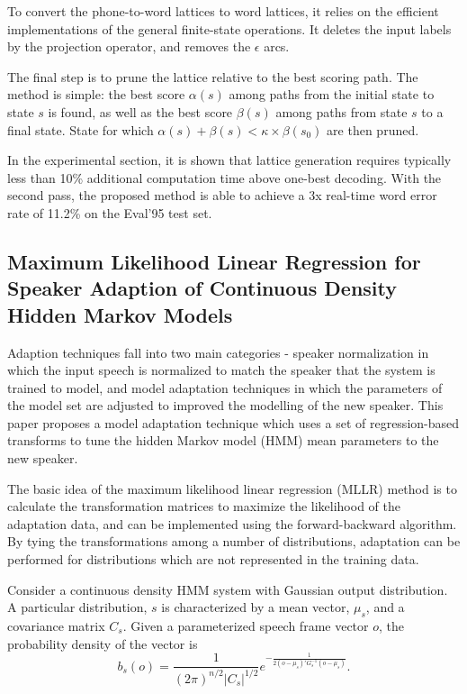 \documentclass[paper=a4, fontsize=18pt]{article} %
\numberwithin{equation}{section} %
\numberwithin{figure}{section} %
\numberwithin{table}{section} %
\begin{document}
To convert the phone-to-word lattices to word lattices, it relies on the efficient implementations of the general finite-state operations. It deletes the input labels by the projection operator, and removes the $\epsilon$ arcs.

The final step is to prune the lattice relative to the best scoring path. The method is simple: the best score $\alpha(s)$ among paths from the initial state to state $s$ is found, as well as the best score $\beta(s)$ among paths from state $s$ to a final state. State for which $\alpha(s) + \beta(s) < \kappa \times \beta(s_0)$ are then pruned.

In the experimental section, it is shown that lattice generation requires typically less than 10\% additional computation time above one-best decoding. With the second pass, the proposed method is able to achieve a 3x real-time word error rate of 11.2\% on the Eval'95 test set.


\subsection{Maximum Likelihood Linear Regression for Speaker Adaption of Continuous Density Hidden Markov Models \cite{Leggetter1995}}

Adaption techniques fall into two main categories - speaker normalization in which the input speech is normalized to match the speaker that the system is trained to model, and model adaptation techniques in which the parameters of the model set are adjusted to improved the modelling of the new speaker. This paper proposes a model adaptation technique which uses a set of regression-based transforms to tune the hidden Markov model (HMM) mean parameters to the new speaker.

The basic idea of the maximum likelihood linear regression (MLLR) method is to calculate the transformation matrices to maximize the likelihood of the adaptation data, and can be implemented using the forward-backward algorithm. By tying the transformations among a number of distributions, adaptation can be performed for distributions which are not represented in the training data.

Consider a continuous density HMM system with Gaussian output distribution. A particular distribution, $s$ is characterized by a mean vector, $\mu_s$, and a covariance matrix $C_s$. Given a parameterized speech frame vector $o$, the probability density of the vector is
$$b_s(o) = \frac{1}{(2\pi)^{n/2} |C_s|^{1/2}} e^{-\frac{1}{2(o - \mu_s)'G_s^{-1}(o-\mu_s)}}.$$
\end{document}
